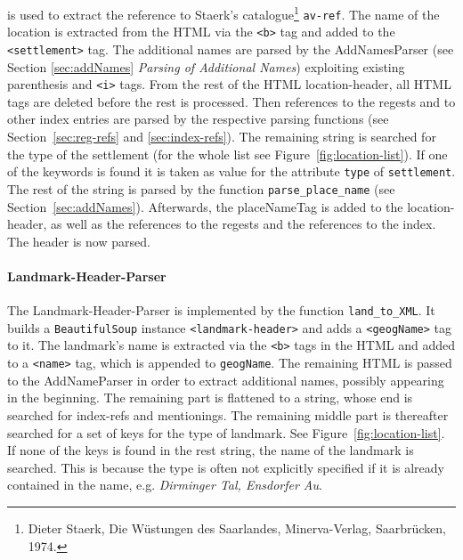 is used to extract the reference to Staerk's catalogue\footnote{Dieter Staerk, Die Wüstungen des Saarlandes, Minerva-Verlag, Saarbrücken, 1974.} \texttt{av-ref}. The name of the location is extracted from the HTML via the \texttt{<b>} tag and added to the \texttt{<settlement>} tag. The additional names are parsed by the AddNamesParser (see Section \ref{sec:addNames} \textit{Parsing of Additional Names}) exploiting existing parenthesis and \texttt{<i>} tags. From the rest of the HTML location-header, all HTML tags are deleted before the rest is processed. Then references to the regests and to other index entries are parsed by the respective parsing functions (see Section~\ref{sec:reg-refs} and \ref{sec:index-refs}). The remaining string is searched for the type of the settlement (for the whole list see Figure~\ref{fig:location-list}). If one of the keywords is found it is taken as value for the attribute \texttt{type} of \texttt{settlement}. The rest of the string is parsed by the function \texttt{parse\_place\_name} (see Section~\ref{sec:addNames}). Afterwards, the placeNameTag is added to the location-header, as well as the references to the regests and the references to the index. The header is now parsed.

\paragraph{Landmark-Header-Parser}
The Landmark-Header-Parser is implemented by the function \texttt{land\_to\_XML}. It builds a \texttt{BeautifulSoup} instance \texttt{<landmark-header>} and adds a \texttt{<geogName>} tag to it. The landmark's name is extracted via the \texttt{<b>} tags in the HTML and added to a \texttt{<name>} tag, which is appended to \texttt{geogName}. The remaining HTML is passed to the AddNameParser in order to extract additional names, possibly appearing in the beginning. The remaining part is flattened to a string, whose end is searched for index-refs and mentionings. The remaining middle part is thereafter searched for a set of keys for the type of landmark. See Figure~\ref{fig:location-list}. If none of the keys is found in the rest string, the name of the landmark is searched. This is because the type is often not explicitly specified if it is already contained in the name, e.g. \textit{Dirminger Tal, Ensdorfer Au}.

